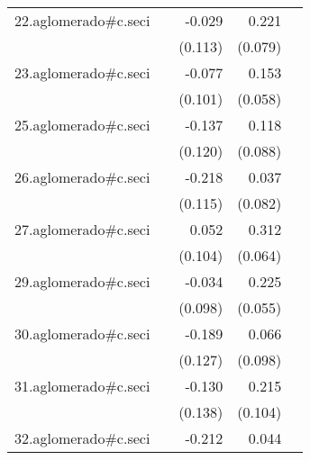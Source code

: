 {\begin{longtable}{l*{4}{D{.}{.}{-1}}}
\addlinespace
22.aglomerado#c.seci&                     &      -0.029         &       0.221\sym{**} &                     \\
            &                     &     (0.113)         &     (0.079)         &                     \\
\addlinespace
23.aglomerado#c.seci&                     &      -0.077         &       0.153\sym{**} &                     \\
            &                     &     (0.101)         &     (0.058)         &                     \\
\addlinespace
25.aglomerado#c.seci&                     &      -0.137         &       0.118         &                     \\
            &                     &     (0.120)         &     (0.088)         &                     \\
\addlinespace
26.aglomerado#c.seci&                     &      -0.218         &       0.037         &                     \\
            &                     &     (0.115)         &     (0.082)         &                     \\
\addlinespace
27.aglomerado#c.seci&                     &       0.052         &       0.312\sym{***}&                     \\
            &                     &     (0.104)         &     (0.064)         &                     \\
\addlinespace
29.aglomerado#c.seci&                     &      -0.034         &       0.225\sym{***}&                     \\
            &                     &     (0.098)         &     (0.055)         &                     \\
\addlinespace
30.aglomerado#c.seci&                     &      -0.189         &       0.066         &                     \\
            &                     &     (0.127)         &     (0.098)         &                     \\
\addlinespace
31.aglomerado#c.seci&                     &      -0.130         &       0.215\sym{*}  &                     \\
            &                     &     (0.138)         &     (0.104)         &                     \\
\addlinespace
32.aglomerado#c.seci&                     &      -0.212         &       0.044         &                     \\

\end{longtable}}
